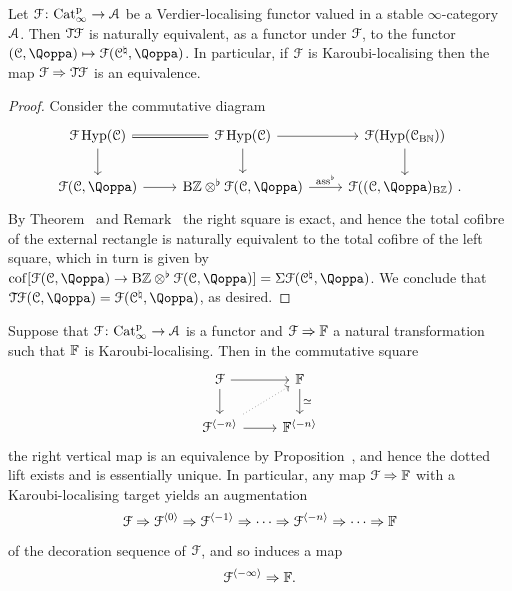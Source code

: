 \begin{proposition}
\label{proposition:T-of-localising}%
Let $\mathcal{F}\colon \mathrm{Cat}^{\mathrm p}_\infty \to \mathcal{A}$ be a Verdier-localising functor valued in a stable $\infty$-category $\mathcal{A}$. Then $\mathcal{T}\mathcal{F}$ is naturally equivalent, as a functor under $\mathcal{F}$, to the functor $(\C,\QF) \mapsto \F(\C^\natural,\QF)$. In particular, if $\mathcal{F}$ is Karoubi-localising then the map $\mathcal{F} \Rightarrow \mathcal{T}\mathcal{F}$ is an equivalence.
\end{proposition}
\begin{proof}
Consider the commutative diagram
\[
\begin{tikzcd}
\F\Hyp(\C)\ar[r,equal]\ar[d]  & \F\Hyp(\C) \ar[r]\ar[d] & \F(\Hyp(\C_{\B\NN}))\ar[d] \\
\F(\C,\QF) \ar[r] & {\B\ZZ} \otimes^{\flat} \F(\C,\QF) \ar[r, "\ass^{\flat}"] & \F((\C,\QF)_{\B\ZZ}) \ .
\end{tikzcd}
\]
By Theorem~ and Remark~ the right square is exact, and hence the total cofibre of the external rectangle is naturally equivalent to the total cofibre of the left square, which in turn is given by $\cof[\F(\C,\QF) \to {\B\ZZ} \otimes^{\flat} \F(\C,\QF)] = \Sig\F(\C^\natural,\QF)$. %
We conclude that $\T\F(\C,\QF) = \F(\C^{\natural},\QF)$, as desired.
\end{proof}



Suppose that $\mathcal{F}\colon \mathrm{Cat}^{\mathrm p}_\infty \to \mathcal{A}$ is a functor and $\mathcal{F} \Rightarrow \mathbb{F}$ a natural transformation such that $\mathbb{F}$ is Karoubi-localising. Then in the commutative square
\[
\begin{tikzcd}
\F \ar[r]\ar[d] & \FF \ar[d, "\simeq"] \\
\F^{\cotower{-n}} \ar[r]\ar[ur,dotted] & \FF^{\cotower{-n}}
\end{tikzcd}
\]
the right vertical map is an equivalence by Proposition~, and hence the dotted lift exists and is essentially unique. In particular, any map $\mathcal{F} \Rightarrow \mathbb{F}$ with a Karoubi-localising target yields an augmentation 
\[
\mathcal{F} \Rightarrow \mathcal{F}^{\langle 0 \rangle} \Rightarrow \mathcal{F}^{\langle -1 \rangle} \Rightarrow \cdots \Rightarrow \mathcal{F}^{\langle -n \rangle} \Rightarrow \cdots \Rightarrow \mathbb{F}
\]
of the decoration sequence of $\mathcal{F}$, and so induces a map
\[
\mathcal{F}^{\langle -\infty \rangle} \Rightarrow \mathbb{F} .
\]

